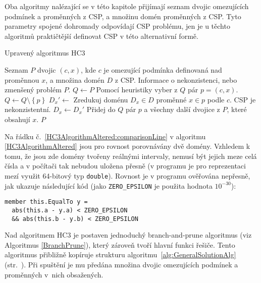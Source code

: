 Oba algoritmy nalézající se v této kapitole přijímají seznam dvojic omezujících podmínek a proměnných z CSP, a množinu domén proměnných z CSP. Tyto parametry spojené dohromady odpovídají CSP problému, jen je u těchto algoritmů praktičtější definovat CSP v této alternativní formě.

\begin{algorithm}
\caption{Upravený algoritmus HC3}
\label{HC3AlgorithmAltered}
\begin{algorithmic}[1]
\Require Seznam $P$ dvojic $(c, x)$, kde $c$ je omezující podmínka definovaná nad proměnnou $x$, a množina domén $D$ z CSP.
\Ensure Informace o nekonzistenci, nebo zmenšený problém $P$.
\State $Q \gets P$
\State Pomocí heuristiky vyber z $Q$ pár $p = (c, x)$. \label{HC3AlgorithmAltered:heuristicLine}
\State $Q \gets Q \setminus \left\{ p \right\}$
\State $D_x' \gets$ Zredukuj doménu $D_x \in D$ proměnné $x \in p$ podle $c$.
\State \Return CSP je nekonzistentní.
\EndIf
{} \label{HC3AlgorithmAltered:comparisonLine}
\State $D_x \gets D_x'$
\State Přidej do $Q$ pár $p$ a všechny další dvojice z $P$, které obsahují $x$.
\EndIf
\EndWhile
\State \Return $P$
\EndProcedure
\end{algorithmic}
\end{algorithm}

Na řádku č.~\ref{HC3AlgorithmAltered:comparisonLine} v algoritmu \ref{HC3AlgorithmAltered} jsou pro rovnost porovnávány dvě domény. Vzhledem k tomu, že jsou zde domény tvořeny reálnými intervaly, nemusí být jejich meze celá čísla a v počítači tak nebudou uložena přesně (v programu je pro reprezentaci mezí využit 64-bitový typ \verb|double|). Rovnost je v programu ověřována nepřesně, jak ukazuje následující kód (jako \verb|ZERO_EPSILON| je použita hodnota $10^{-30}$):

\begin{Verbatim}[samepage=true]
member this.EqualTo y =
  abs(this.a - y.a) < ZERO_EPSILON 
  && abs(this.b - y.b) < ZERO_EPSILON
\end{Verbatim}

Nad algoritmem HC3 je postaven jednoduchý branch-and-prune algoritmus (viz Algoritmus \ref{BranchPrune}), který zároveň tvoří hlavní funkci řešiče. Tento algoritmus přibližně kopíruje strukturu algoritmu~\ref{alg:GeneralSolutionAlg} (str.~\pageref{alg:GeneralSolutionAlg}). Při spuštění je mu předána množina dvojic omezujících podmínek a proměnných v~nich obsažených.

